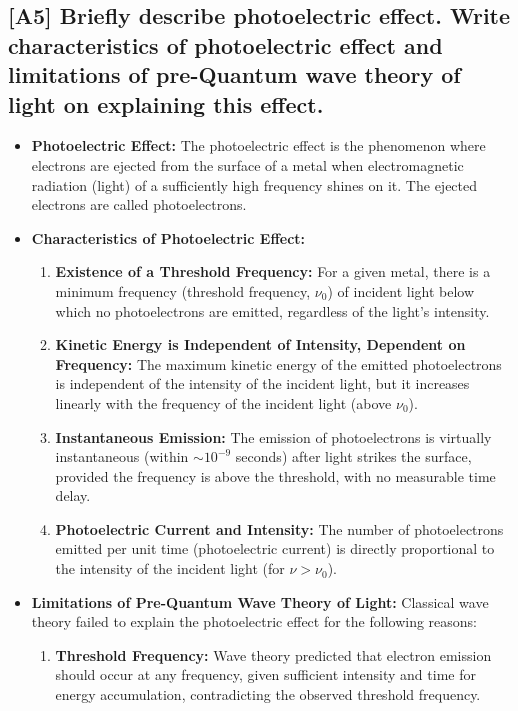 \documentclass[12pt]{article}
\begin{document}
\subsection{[A5] Briefly describe photoelectric effect. Write characteristics of photoelectric effect and limitations of pre-Quantum wave theory of light on explaining this effect.}

\begin{itemize}
    \item \textbf{Photoelectric Effect:} The photoelectric effect is the phenomenon where electrons are ejected from the surface of a metal when electromagnetic radiation (light) of a sufficiently high frequency shines on it. The ejected electrons are called photoelectrons.
    \item \textbf{Characteristics of Photoelectric Effect:}
    \begin{enumerate}[label=\alph*.]
        \item \textbf{Existence of a Threshold Frequency:} For a given metal, there is a minimum frequency (threshold frequency, $\nu_0$) of incident light below which no photoelectrons are emitted, regardless of the light's intensity.
        \item \textbf{Kinetic Energy is Independent of Intensity, Dependent on Frequency:} The maximum kinetic energy of the emitted photoelectrons is independent of the intensity of the incident light, but it increases linearly with the frequency of the incident light (above $\nu_0$).
        \item \textbf{Instantaneous Emission:} The emission of photoelectrons is virtually instantaneous (within $\sim 10^{-9}$ seconds) after light strikes the surface, provided the frequency is above the threshold, with no measurable time delay.
        \item \textbf{Photoelectric Current and Intensity:} The number of photoelectrons emitted per unit time (photoelectric current) is directly proportional to the intensity of the incident light (for $\nu > \nu_0$).
    \end{enumerate}
    \item \textbf{Limitations of Pre-Quantum Wave Theory of Light:} Classical wave theory failed to explain the photoelectric effect for the following reasons:
    \begin{enumerate}[label=\roman*.]
        \item \textbf{Threshold Frequency:} Wave theory predicted that electron emission should occur at any frequency, given sufficient intensity and time for energy accumulation, contradicting the observed threshold frequency.

\end{enumerate}
\end{itemize}
\end{document}
